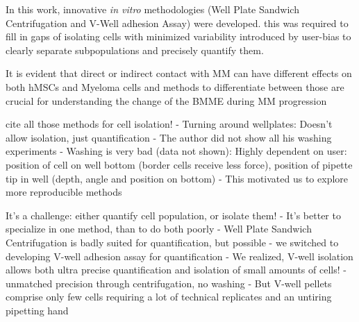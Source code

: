 
%
\label{sec:discussion_novel_methods}%

In this work, innovative \textit{in vitro} methodologies (Well Plate Sandwich
Centrifugation and V-Well adhesion Assay) were developed. this was required to
fill in gaps of isolating cells with minimized variability introduced by
user-bias to clearly separate subpopulations and precisely quantify them.


It is evident that direct or indirect contact with MM can have different effects
on both hMSCs and Myeloma cells and methods to differentiate between those are
crucial for understanding the change of the \ac{BMME} during \ac{MM} progression
\cite{fairfieldMultipleMyelomaCells2020, dziadowiczBoneMarrowStromaInduced2022}

cite all those methods for cell isolation!
- Turning around wellplates: Doesn't allow isolation, just quantification
- The author did not show all his washing experiments
- Washing is very bad (data not shown): Highly dependent on user:
position of cell on well bottom (border cells receive less force), position of
pipette tip in well (depth, angle and position on bottom)
- This motivated us to explore more reproducible methods

It's a challenge: either quantify cell population, or isolate them!
- It's better to specialize in one method, than to do both poorly
- Well Plate Sandwich Centrifugation is badly suited for quantification, but possible
- we switched to developing V-well adhesion assay for quantification
- We realized, V-well isolation allows both ultra precise quantification and
isolation of small amounts of cells!
- unmatched precision through centrifugation, no washing
- But V-well pellets comprise only few cells requiring a lot of technical
replicates and an untiring pipetting hand %



